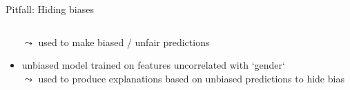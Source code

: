\documentclass[11pt,compress,t,notes=noshow, aspectratio=169, xcolor=table]{beamer}
\begin{document}
\begin{frame}{Pitfall: Hiding biases }
\begin{columns}[T, totalwidth=\linewidth]
\begin{column}{0.5\textwidth}
\begin{itemize}
	        $\leadsto$ used 
	        to make biased / unfair predictions
	        \item unbiased model trained on features uncorrelated with `gender`\\
	        $\leadsto$ used to produce explanations based on unbiased predictions to hide bias
	    \end{itemize}
	    \end{column}
	\end{columns}
\end{frame}
\end{document}
